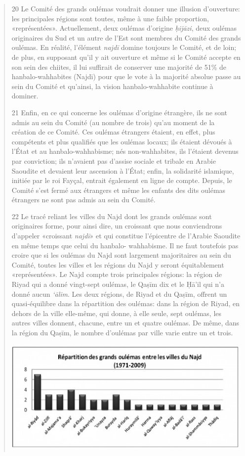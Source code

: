\begin{quote}
20 Le Comité des grands oulémas voudrait donner une illusion
d'ouverture: les principales régions sont toutes, même à une faible
proportion, «représentées». Actuellement, deux oulémas d'origine
\emph{ḥijāzi}, deux oulémas originaires du Sud et un autre de l'Est sont
membres du Comité des grands oulémas. En réalité, l'élément \emph{najdī}
domine toujours le Comité, et de loin; de plus, en supposant qu'il y ait
ouverture et même si le Comité accepte en son sein des chiites, il lui
suffirait de conserver une majorité de 51\% de hanbalo-wahhabites
(Najdī) pour que le vote à la majorité absolue passe au sein du Comité
et qu'ainsi, la vision hanbalo-wahhabite continue à dominer.

21 Enfin, en ce qui concerne les oulémas d'origine étrangère, ils ne
sont admis au sein du Comité (au nombre de trois) qu'au moment de la
création de ce Comité. Ces oulémas étrangers étaient, en effet, plus
compétents et plus qualifiés que les oulémas locaux; ils étaient dévoués
à l'État et au hanbalo-wahhabisme; nés non-wahhabites, ils l'étaient
devenus par conviction; ils n'avaient pas d'assise sociale et tribale en
Arabie Saoudite et devaient leur ascension à l'État; enfin, la
solidarité islamique, initiée par le roi Fayçal, entrait également en
ligne de compte. Depuis, le Comité s'est fermé aux étrangers et même les
enfants des dits oulémas étrangers ne sont pas admis au sein du Comité.

22 Le tracé reliant les villes du Najd dont les grands oulémas sont
originaires forme,
pour ainsi dire, un croissant que nous conviendrons d'appeler «croissant
\emph{najdī}» et qui constitue l'épicentre de l'Arabie Saoudite en même
temps que celui du hanbalo- wahhabisme. Il ne faut toutefois pas croire
que si les oulémas du Najd sont largement majoritaires au sein du
Comité, toutes les villes et les régions du Najd y seront équitablement
«représentées». Le Najd compte trois principales régions: la région de
Riyad qui a donné vingt-sept oulémas, le Qaṣīm dix et le Ḥā'il qui n'a
donné aucun \emph{`ālim}. Les deux régions, de Riyad et du Qaṣīm,
offrent un quasi-équilibre dans la répartition des oulémas: dans la
région de Riyad, en dehors de la ville elle-même, qui donne, à elle
seule, sept oulémas, les autres villes donnent, chacune, entre un et
quatre oulémas. De même, dans la région du Qaṣīm, le nombre d'oulémas
par ville varie entre un et trois.
\begin{marginfigure}
\includegraphics[width=1.2\textwidth]{CourantsIslamContemporain/ImagesCourantsIslamContemporain/image12.jpeg}
\end{marginfigure}
 


\end{quote}

